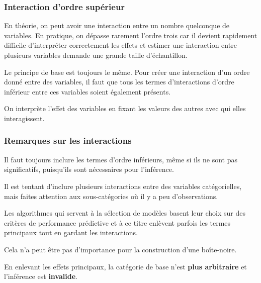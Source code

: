 \documentclass[xcolor={dvipsnames}]{beamer}
\begin{document}
\begin{frame}
 
\frametitle{Interaction d'ordre supérieur}
\bi
\item En théorie, on peut avoir une interaction entre un nombre quelconque de variables. En pratique, on dépasse rarement l'ordre trois car il devient rapidement difficile d'interpréter correctement les effets et estimer une interaction entre plusieurs variables demande une grande taille d'échantillon. 
\item Le principe de base est toujours le même. Pour créer une interaction d'un ordre donné entre des variables, il faut que tous les termes d'interactions d'ordre inférieur entre ces variables soient également présents. 
\item On interprète l'effet des variables en fixant les valeurs des autres avec qui elles interagissent. 

\ei
\end{frame}


\begin{frame}[fragile]
\frametitle{Remarques sur les interactions}
\bi
\item Il faut toujours inclure les termes d'ordre inférieurs, même si ils ne sont pas significatifs, puisqu'ils sont nécessaires pour l'inférence.
\item Il est tentant d'inclure plusieurs interactions entre des variables catégorielles, mais faites attention aux sous-catégories où il y a peu d'observations.
\item Les algorithmes qui servent à la sélection de modèles basent leur choix sur des critères de performance prédictive et à ce titre enlèvent parfois les termes principaux tout en gardant les interactions.
\bi \item Cela n'a peut être pas d'importance pour la construction d'une boîte-noire.
\ei
\item En enlevant les effets principaux, la catégorie de base n'est \textbf{plus arbitraire} et l'inférence est \textbf{invalide}.

\ei
\end{frame}
\end{document}
